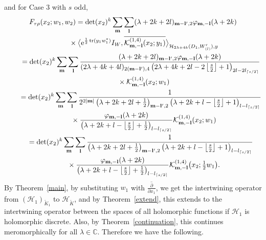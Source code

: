 \documentclass[pdftex]{sigma}
\numberwithin{equation}{section}
\newcommand{\bl}{\mathbf{l}}
\newcommand{\bm}{\mathbf{m}}
\newcommand{\BC}{\mathbb{C}}
\newcommand{\cH}{\mathcal{H}}
\newcommand{\cK}{\mathcal{K}}
\newcommand{\tr}{\operatorname{tr}}
\begin{document}
and for Case 3 with $s$ odd,
\begin{gather*}
 F_{\tau\rho}(x_2;w_1,w_2) =\det(x_2)^{k}\sum_\bm\sum_\bl (\lambda+2k+2l)_{\bm-\bl',2}\varphi_{\bm,-\bl}(\lambda+2k)\\
\qquad\quad{} \times\bigl\langle {\rm e}^{\frac{1}{2}\tr(y_1w_1^*)}I_W,\overline{\cK_{\bm,-\bl}^{(1,4)}(x_2;y_1)}
\bigr\rangle_{\cH_{2\lambda+4k}(D_1,W_{(l)}'),y} \\
\qquad{} =\det(x_2)^{k}\sum_\bm\sum_\bl \frac{(\lambda+2k+2l)_{\bm-\bl',2}\varphi_{\bm,-\bl}(\lambda+2k)}
{(2\lambda+4k+4l)_{2(\bm-\bl'),4}\left(2\lambda+4k+2l-2\left\lfloor\frac{s}{2}\right\rfloor+1\right)_{2l-2l_{\lceil s/2\rceil}}}\\
\qquad\quad{} \times\cK_{\bm,-\bl}^{(1,4)}(x_2;w_1)\\
\qquad{} =\det(x_2)^{k}\sum_\bm\sum_\bl \frac{1}{2^{2|\bm|}\left(\lambda+2k+2l+\frac{1}{2}\right)_{\bm-\bl',2}
\left(\lambda+2k+l-\left\lfloor\frac{s}{2}\right\rfloor+1\right)_{l-l_{\lceil s/2\rceil}}}\\
\qquad\quad{} \times\frac{\varphi_{\bm,-\bl}(\lambda+2k)}
{\left(\lambda+2k+l-\left\lfloor\frac{s}{2}\right\rfloor+\frac{1}{2}\right)_{l-l_{\lceil s/2\rceil}}}
\cK_{\bm,-\bl}^{(1,4)}(x_2;w_1)\\
\qquad{} =\det(x_2)^{k}\sum_\bm\sum_\bl \frac{1}{\left(\lambda+2k+2l+\frac{1}{2}\right)_{\bm-\bl',2}
\left(\lambda+2k+l-\left\lfloor\frac{s}{2}\right\rfloor+1\right)_{l-l_{\lceil s/2\rceil}}}\\
\qquad\quad{} \times\frac{\varphi_{\bm,-\bl}(\lambda+2k)}
{\left(\lambda+2k+l-\left\lfloor\frac{s}{2}\right\rfloor+\frac{1}{2}\right)_{l-l_{\lceil s/2\rceil}}}
\cK_{\bm,-\bl}^{(1,4)}\big(x_2;\tfrac{1}{2}w_1\big).
\end{gather*}
By Theorem~\ref{main}, by substituting $w_1$ with $\overline{\frac{\partial}{\partial x_1}}$, we get the intertwining operator from $(\cH_1)_{\tilde{K}_1}$ to $\cH_{\tilde{K}}$, and by Theorem~\ref{extend}, this extends to the intertwining operator between the spaces of all holomorphic functions if $\cH_1$ is holomorphic discrete. Also, by Theorem~\ref{continuation}, this continues meromorphically for all $\lambda\in\BC$. Therefore we have the following.
\end{document}

